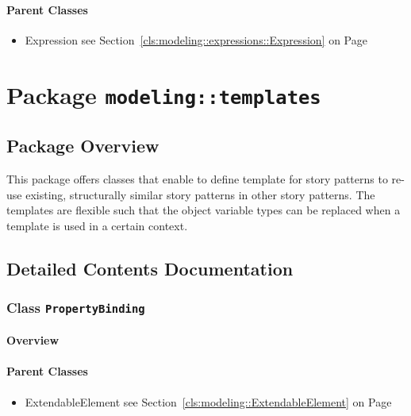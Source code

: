 \paragraph{Parent Classes}
\begin{itemize}
\item Expression see Section~\ref{cls:modeling::expressions::Expression} on Page~\pageref{cls:modeling::expressions::Expression}\end{itemize}
\newpage
		


\section{Package \bfseries \texttt{modeling::templates}\normalfont}
\subsection{Package Overview}
	
			
This package offers classes that enable to define template for story patterns to re-use existing, structurally similar story patterns in other story patterns. The templates are flexible such that the object variable types can be replaced when a template is used in a certain context.	
		
	
			
		



\subsection{Detailed Contents Documentation}
\subsubsection{\Large{Class \bfseries \texttt{PropertyBinding}\normalfont}}
\label{cls:modeling::templates::PropertyBinding} 
\paragraph{Overview}

	



\paragraph{Parent Classes}
\begin{itemize}
\item ExtendableElement see Section~\ref{cls:modeling::ExtendableElement} on Page~\pageref{cls:modeling::ExtendableElement}\end{itemize}

